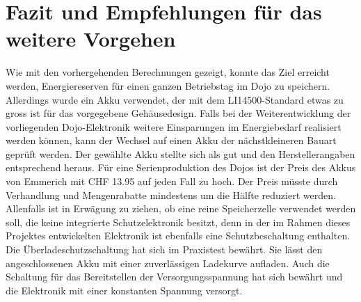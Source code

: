 \section{Fazit und Empfehlungen für das weitere Vorgehen}

Wie mit den vorhergehenden Berechnungen gezeigt, konnte das Ziel erreicht werden, Energiereserven für einen ganzen Betriebstag im Dojo zu speichern. Allerdings wurde ein Akku verwendet, der mit dem LI14500-Standard etwas zu gross ist für das vorgegebene Gehäusedesign. Falls bei der Weiterentwicklung der vorliegenden Dojo-Elektronik weitere Einsparungen im Energiebedarf realisiert werden können, kann der Wechsel auf einen Akku der nächstkleineren Bauart geprüft werden. Der gewählte Akku stellte sich als gut und den Herstellerangaben entsprechend heraus. Für eine Serienproduktion des Dojos ist der Preis des Akkus von Emmerich mit CHF 13.95 auf jeden Fall zu hoch. Der Preis müsste durch Verhandlung und Mengenrabatte mindestens um die Hälfte reduziert werden. Allenfalls ist in Erwägung zu ziehen, ob eine reine Speicherzelle verwendet werden soll, die keine integrierte Schutzelektronik besitzt, denn in der im Rahmen dieses Projektes entwickelten Elektronik ist ebenfalls eine Schutzbeschaltung enthalten. Die Überladeschutzschaltung hat sich im Praxistest bewährt. Sie lässt den angeschlossenen Akku mit einer zuverlässigen Ladekurve aufladen. Auch die Schaltung für das Bereitstellen der Versorgungsspannung hat sich bewährt und die Elektronik mit einer konstanten Spannung versorgt. 
